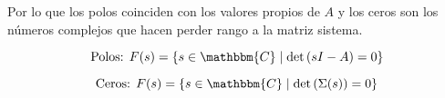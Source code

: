         Por lo que los polos coinciden con los valores propios de $A$ y los ceros son los números complejos que hacen perder rango a la matriz sistema.

        \begin{equation}
            \text{Polos: } F(s) = \left\{ s \in \mathbbm{C} \mid \det{\left( sI - A \right)} = 0 \right\}
        \end{equation}

        \begin{equation}
            \text{Ceros: } F(s) = \left\{ s \in \mathbbm{C} \mid \det{\left( \Sigma(s) \right)} = 0 \right\}
        \end{equation}


    \newpage

